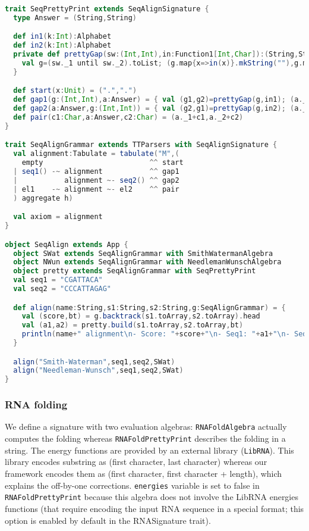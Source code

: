 \begin{lstlisting}[language=Scala,captionpos=none]
trait SeqPrettyPrint extends SeqAlignSignature {
  type Answer = (String,String)

  def in1(k:Int):Alphabet
  def in2(k:Int):Alphabet
  private def prettyGap(sw:(Int,Int),in:Function1[Int,Char]):(String,String) = {
    val g=(sw._1 until sw._2).toList; (g.map{x=>in(x)}.mkString(""),g.map{x=>"-"}.mkString(""))
  }

  def start(x:Unit) = (".",".")
  def gap1(g:(Int,Int),a:Answer) = { val (g1,g2)=prettyGap(g,in1); (a._1+g1,a._2+g2) }
  def gap2(a:Answer,g:(Int,Int)) = { val (g2,g1)=prettyGap(g,in2); (a._1+g1,a._2+g2) }
  def pair(c1:Char,a:Answer,c2:Char) = (a._1+c1,a._2+c2)
}

trait SeqAlignGrammar extends TTParsers with SeqAlignSignature {
  val alignment:Tabulate = tabulate("M",(
    empty                         ^^ start
  | seq1() -~ alignment           ^^ gap1
  |           alignment ~- seq2() ^^ gap2
  | el1    -~ alignment ~- el2    ^^ pair
  ) aggregate h)

  val axiom = alignment
}

object SeqAlign extends App {
  object SWat extends SeqAlignGrammar with SmithWatermanAlgebra
  object NWun extends SeqAlignGrammar with NeedlemanWunschAlgebra
  object pretty extends SeqAlignGrammar with SeqPrettyPrint
  val seq1 = "CGATTACA"
  val seq2 = "CCCATTAGAG"

  def align(name:String,s1:String,s2:String,g:SeqAlignGrammar) = {
    val (score,bt) = g.backtrack(s1.toArray,s2.toArray).head
    val (a1,a2) = pretty.build(s1.toArray,s2.toArray,bt)
    println(name+" alignment\n- Score: "+score+"\n- Seq1: "+a1+"\n- Seq2: "+a2+"\n")
  }

  align("Smith-Waterman",seq1,seq2,SWat)
  align("Needleman-Wunsch",seq1,seq2,SWat)
}
\end{lstlisting}

\newpage
\subsubsection{RNA folding} \label{ex_rnafold}
We define a signature with two evaluation algebras: {\tt RNAFoldAlgebra} actually computes the folding whereas {\tt RNAFoldPrettyPrint} describes the folding in a string. The energy functions are provided by an external library ({\tt LibRNA}). This library encodes substring as (first character, last character) whereas our framework encodes them as (first character, first character + length), which explains the off-by-one corrections. {\tt energies} variable is set to false in {\tt RNAFoldPrettyPrint} because this algebra does not involve the LibRNA energies functions (that require encoding the input RNA sequence in a special format; this option is enabled by default in the RNASignature trait).

